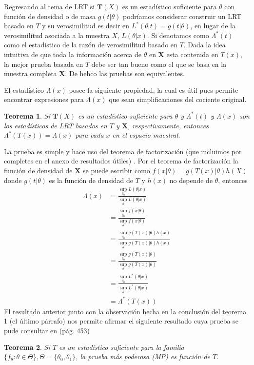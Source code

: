 \documentclass[peerreview]{IEEEtran}
\newtheorem{theorem}{Teorema}
\begin{document}
Regresando al tema de LRT si $\mathbf{T}(X)$ es un estadístico suficiente para $\theta$ con función de densidad o de masa $g(t|\theta)$ podríamos considerar construir un LRT basado en $T$ y su verosimilitud es decir en $L^*(\theta|t) = g(t|\theta)$, en lugar de la verosimilitud asociada a la muestra $X$, $L(\theta|x)$. Si denotamos como $\Lambda^*(t)$ como el estadístico de la razón de verosimilitud basado en $T$. Dada la idea intuitiva de que toda la información acerca de $\theta$ en $\mathbf{X}$ esta contenida en $T(x)$, la mejor prueba basada en $T$ debe ser tan bueno como el que se basa en la muestra completa $\mathbf{X}$. De hehco las pruebas son equivalentes.

El estadístico $\Lambda(x)$ posee la siguiente propiedad, la cual es útil pues permite encontrar expresiones para $\Lambda(x)$ que sean simplificaciones del cociente original.
 \begin{theorem}
Si $\mathbf{T}(X)$ es un estadístico suficiente para $\theta$ y $\Lambda^*(t)$ y $\Lambda(x)$ son los estadísticos de LRT basados en $T$ y $\mathbf{X}$, respectivamente, entonces $\Lambda^*(T(x)) = \Lambda(x)$ para cada $x$ en el espacio muestral.
\end{theorem}
La prueba es simple y hace uso del teorema de factorización (que incluimos por completes en el anexo de resultados útiles) .
Por el teorema de factorización la función de densidad de $\mathbf{X}$ se puede escribir como $f(x|\theta) = g(T(x)|\theta)h(X)$ donde $g(t|\theta)$ es la función de densidad de $T$ y $h(x)$ no depende de $\theta$, entonces 
\[
\begin{split}
\Lambda(x) &= \frac{ \sup_{\theta_0} L(\theta | x)}{\sup_{\theta} L(\theta | x)}\\
 & = \frac{\sup_{\theta_0} f( x| \theta) }{\sup_{\theta} f( x| \theta)}\\
 & = \frac{\sup_{\theta_0} g( T(x)| \theta)h(x) }{\sup_{\theta} g( T(x)| \theta)h(x)}\\
 & = \frac{\sup_{\theta_0} g( T(x)| \theta) }{\sup_{\theta} g( T(x)| \theta)}\\
 &= \frac{ \sup_{\theta_0} L^*(\theta | x)}{\sup_{\theta} L^*(\theta | x)}\\
 & = \Lambda^*(T(x))
\end{split}
\] 
El resultado anterior junto con la observación hecha en la conclusión del teorema 1 (el último párrafo) nos permite afirmar el siguiente resultado cuya prueba se pude consultar en \cite{Rohatgi} (pág. 453)
\begin{theorem}
Si $T$ es un estadístico suficiente para la familia $\{ f_\theta: \theta \in \Theta\}, \Theta = \{\theta_0, \theta_1\}$, la prueba más poderosa (MP) es función de $T$.
\end{theorem}
\end{document}
